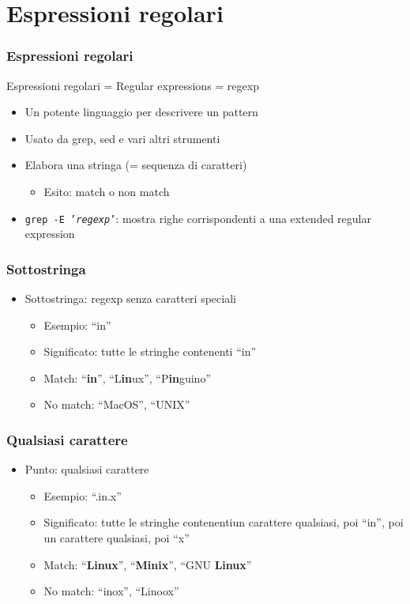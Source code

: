\documentclass[xetex,table]{beamer}
\begin{document}
\section{Espressioni regolari}

\begin{frame}
  \frametitle{Espressioni regolari}
  Espressioni regolari = Regular expressions = regexp
  \begin{itemize}
  \item Un potente linguaggio per descrivere un pattern
  \item Usato da grep, sed e vari altri strumenti
  \item Elabora una stringa (= sequenza di caratteri)
    \begin{itemize}
    \item Esito: match o non match
    \end{itemize}
  \item \texttt{grep -E '{\em regexp}'}: mostra righe corrispondenti a
    una extended regular expression
  \end{itemize}
\end{frame}

\begin{frame}
  \frametitle{Sottostringa}
  \begin{itemize}
  \item Sottostringa: regexp senza caratteri speciali
    \begin{itemize}
    \item Esempio: ``in''
    \item Significato: tutte le stringhe contenenti ``in''
    \item Match: ``{\bf in}'', ``L{\bf in}ux'', ``P{\bf in}guino''
    \item No match: ``MacOS'', ``UNIX''
    \end{itemize}
  \end{itemize}
\end{frame}

\begin{frame}
  \frametitle{Qualsiasi carattere}
  \begin{itemize}
  \item Punto: qualsiasi carattere
    \begin{itemize}
    \item Esempio: ``.in.x''
    \item Significato: tutte le stringhe contenentiun carattere
      qualsiasi, poi ``in'', poi un carattere qualsiasi, poi ``x''
    \item Match: ``{\bf Linux}'', ``{\bf Minix}'', ``GNU {\bf Linux}''
    \item No match: ``inox'', ``Linoox''
    \end{itemize}
  \end{itemize}
\end{frame}
\end{document}
